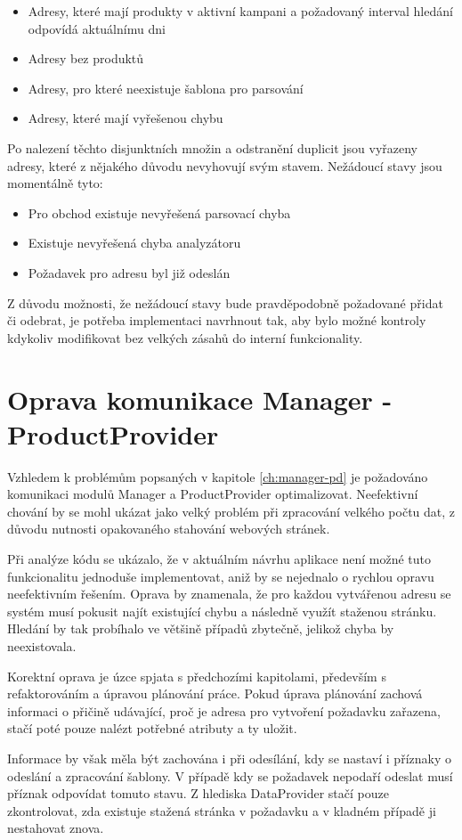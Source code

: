 \documentclass[thesis=B,czech]{FITthesis}[2012/06/26]
\begin{document}
\begin{itemize}
\item Adresy, které mají produkty v aktivní kampani a požadovaný interval hledání odpovídá aktuálnímu dni
\item Adresy bez produktů
\item Adresy, pro které neexistuje šablona pro parsování
\item Adresy, které mají vyřešenou chybu
\end{itemize}

Po nalezení těchto disjunktních množin a odstranění duplicit jsou vyřazeny adresy, které z nějakého důvodu nevyhovují svým stavem.
Nežádoucí stavy jsou momentálně tyto:

\begin{itemize}
\item Pro obchod existuje nevyřešená parsovací chyba
\item Existuje nevyřešená chyba analyzátoru
\item Požadavek pro adresu byl již odeslán
\end{itemize}

Z důvodu možnosti, že nežádoucí stavy bude pravděpodobně požadované přidat či odebrat, je potřeba implementaci navrhnout tak, aby bylo možné kontroly kdykoliv modifikovat bez velkých zásahů do interní funkcionality.

\section{Oprava komunikace Manager - ProductProvider}
Vzhledem k problémům popsaných v kapitole \ref{ch:manager-pd} je požadováno komunikaci modulů Manager a ProductProvider optimalizovat.
Neefektivní chování by se mohl ukázat jako velký problém při zpracování velkého počtu dat, z důvodu nutnosti opakovaného
stahování webových stránek. 
\par
Při analýze kódu se ukázalo, že v aktuálním návrhu aplikace není možné tuto funkcionalitu jednoduše implementovat, aniž by se nejednalo o rychlou opravu neefektivním řešením. Oprava by znamenala, že pro každou vytvářenou adresu se systém musí pokusit najít
existující chybu a následně využít staženou stránku. Hledání by tak probíhalo ve většině případů zbytečně, jelikož chyba by neexistovala.
\par
Korektní oprava je úzce spjata s předchozími kapitolami, především s refaktorováním a úpravou plánování práce. Pokud úprava plánování zachová
informaci o přičině udávající, proč je adresa pro vytvoření požadavku zařazena, stačí poté pouze nalézt potřebné atributy a ty uložit.
\par
Informace by však měla být zachována i při odesílání, kdy se nastaví i příznaky o odeslání a zpracování šablony. V případě
kdy se požadavek nepodaří odeslat musí příznak odpovídat tomuto stavu. Z hlediska DataProvider stačí pouze zkontrolovat, zda existuje
stažená stránka v požadavku a v kladném případě ji nestahovat znova.
\end{document}
